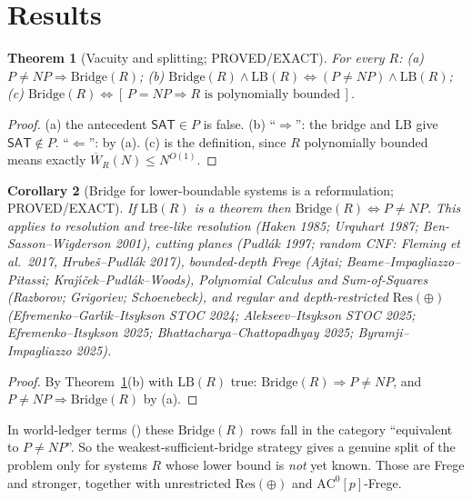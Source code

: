 \documentclass[11pt]{article}
\newtheorem{theorem}{Theorem}
\newtheorem{corollary}[theorem]{Corollary}
\theoremstyle{definition}
\newcommand{\SAT}{\mathsf{SAT}}
\newcommand{\Wbar}{\overline W}
\begin{document}
\section{Results}
\begin{theorem}[Vacuity and splitting; PROVED/EXACT]\label{thm:vac}
For every $R$: (a) $P\ne NP\Rightarrow\mathrm{Bridge}(R)$;
(b) $\mathrm{Bridge}(R)\wedge\mathrm{LB}(R)\iff (P\ne NP)\wedge\mathrm{LB}(R)$;
(c) $\mathrm{Bridge}(R)\iff [\,P=NP\Rightarrow R\text{ is polynomially bounded}\,]$.
\end{theorem}
\begin{proof}
(a) the antecedent $\SAT\in P$ is false. (b) ``$\Rightarrow$'': the bridge and LB give
$\SAT\notin P$. ``$\Leftarrow$'': by (a). (c) is the definition, since $R$ polynomially
bounded means exactly $\Wbar_R(N)\le N^{O(1)}$.
\end{proof}
\begin{corollary}[Bridge for lower-boundable systems is a reformulation; PROVED/EXACT]
If $\mathrm{LB}(R)$ is a theorem then $\mathrm{Bridge}(R)\iff P\ne NP$. This applies to
resolution and tree-like resolution (Haken 1985; Urquhart 1987; Ben-Sasson--Wigderson 2001),
cutting planes (Pudl\'ak 1997; random CNF: Fleming et al.\ 2017, Hrube\v{s}--Pudl\'ak 2017),
bounded-depth Frege (Ajtai; Beame--Impagliazzo--Pitassi; Kraj\'\i\v{c}ek--Pudl\'ak--Woods),
Polynomial Calculus and Sum-of-Squares (Razborov; Grigoriev; Schoenebeck), and regular and
depth-restricted $\mathrm{Res}(\oplus)$ (Efremenko--Garlik--Itsykson STOC 2024;
Alekseev--Itsykson STOC 2025; Efremenko--Itsykson 2025; Bhattacharya--Chattopadhyay 2025;
Byramji--Impagliazzo 2025).
\end{corollary}
\begin{proof}
By Theorem~\ref{thm:vac}(b) with $\mathrm{LB}(R)$ true: $\mathrm{Bridge}(R)\Rightarrow P\ne NP$,
and $P\ne NP\Rightarrow\mathrm{Bridge}(R)$ by (a).
\end{proof}
\noindent In world-ledger terms () these
$\mathrm{Bridge}(R)$ rows fall in the category ``equivalent to $P\ne NP$''. So the
weakest-sufficient-bridge strategy gives a genuine split of the problem only for systems $R$ whose
lower bound is \emph{not} yet known. Those are Frege and stronger, together with unrestricted
$\mathrm{Res}(\oplus)$ and $\mathrm{AC}^0[p]$-Frege.
\end{document}
